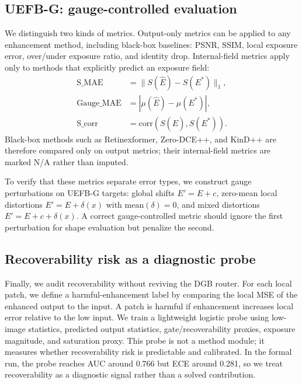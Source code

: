 \subsection{UEFB-G: gauge-controlled evaluation}

We distinguish two kinds of metrics. Output-only metrics can be applied to any enhancement method, including black-box baselines: PSNR, SSIM, local exposure error, over/under exposure ratio, and identity drop. Internal-field metrics apply only to methods that explicitly predict an exposure field:
\begin{align}
\mathrm{S\_MAE} &= \|S(\hat{E}) - S(E^*)\|_1, \\
\mathrm{Gauge\_MAE} &= |\mu(\hat{E}) - \mu(E^*)|, \\
\mathrm{S\_corr} &= \mathrm{corr}(S(\hat{E}), S(E^*)).
\end{align}
Black-box methods such as Retinexformer, Zero-DCE++, and KinD++ are therefore compared only on output metrics; their internal-field metrics are marked N/A rather than imputed.

To verify that these metrics separate error types, we construct gauge perturbations on UEFB-G targets: global shifts $E'=E+c$, zero-mean local distortions $E'=E+\delta(x)$ with $\mathrm{mean}(\delta)=0$, and mixed distortions $E'=E+c+\delta(x)$. A correct gauge-controlled metric should ignore the first perturbation for shape evaluation but penalize the second.

\subsection{Recoverability risk as a diagnostic probe}

Finally, we audit recoverability without reviving the DGB router. For each local patch, we define a harmful-enhancement label by comparing the local MSE of the enhanced output to the input. A patch is harmful if enhancement increases local error relative to the low input. We train a lightweight logistic probe using low-image statistics, predicted output statistics, gate/recoverability proxies, exposure magnitude, and saturation proxy. This probe is not a method module; it measures whether recoverability risk is predictable and calibrated. In the formal run, the probe reaches AUC around 0.766 but ECE around 0.281, so we treat recoverability as a diagnostic signal rather than a solved contribution.
